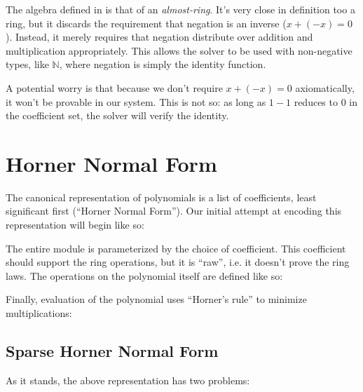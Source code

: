 \documentclass[draft, twocolumn]{article}
\theoremstyle{definition}
\begin{document}
The algebra defined in \cite{hutchison_proving_2005} is that of an
\emph{almost-ring}. It's very close in definition too a ring, but it discards
the requirement that negation is an inverse (\(x + (-x) = 0\)). Instead, it
merely requires that negation distribute over addition and multiplication
appropriately. This allows the solver to be used with non-negative types, like
\(\mathbb{N}\), where negation is simply the identity function.

A potential worry is that because we don't require \(x + (-x) = 0\)
axiomatically, it won't be provable in our system. This is not so: as long as
\(1 - 1\) reduces to \(0\) in the coefficient set, the solver will verify the
identity.
\section{Horner Normal Form}
The canonical representation of polynomials is a list of coefficients, least
significant first (``Horner Normal Form''). Our initial attempt at encoding this
representation will begin like so:

The entire module is parameterized by the choice of coefficient. This
coefficient should support the ring operations, but it is ``raw'', i.e. it
doesn't prove the ring laws. The operations on the polynomial itself are defined
like so\footnotemark:

Finally, evaluation of the polynomial uses ``Horner's rule'' to minimize
multiplications:
\subsection{Sparse Horner Normal Form}
As it stands, the above representation has two problems:
\end{document}
